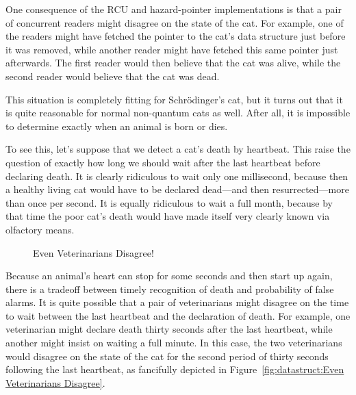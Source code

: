 One consequence of the RCU and hazard-pointer implementations is
that a pair of concurrent readers might disagree on the state of
the cat.
For example, one of the readers might have fetched the pointer to
the cat's data structure just before it was removed, while another
reader might have fetched this same pointer just afterwards.
The first reader would then believe that the cat was alive, while
the second reader would believe that the cat was dead.

This situation is completely fitting for Schr\"odinger's
cat, but it turns out that it is quite reasonable for normal
non-quantum cats as well.
After all, it is impossible to determine exactly when an animal is born
or dies.

To see this, let's suppose that we detect a cat's death by heartbeat.
This raise the question of exactly how long we should wait after the
last heartbeat before declaring death.
It is clearly ridiculous to wait only one millisecond, because then
a healthy living cat would have to be declared dead---and then
resurrected---more than once per second.
It is equally ridiculous to wait a full month, because by that time
the poor cat's death would have made itself very clearly known
via olfactory means.

\begin{figure}[tb]
\centering
{}
\caption{Even Veterinarians Disagree!}
\end{figure}

Because an animal's heart can stop for some seconds and then start up
again, there is a tradeoff between timely recognition of death and
probability of false alarms.
It is quite possible that a pair of veterinarians might disagree on
the time to wait between the last heartbeat and the declaration of
death.
For example, one veterinarian might declare death thirty seconds after
the last heartbeat, while another might insist on waiting a full
minute.
In this case, the two veterinarians would disagree on the state of the
cat for the second period of thirty seconds following the last heartbeat,
as fancifully depicted in
Figure~\ref{fig:datastruct:Even Veterinarians Disagree}.

